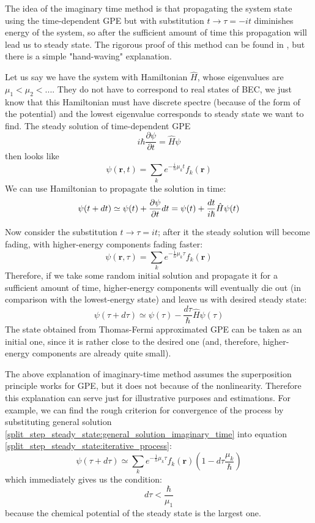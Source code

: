\documentclass[12pt,notitlepage]{report}
\begin{document}
The idea of the imaginary time method is that propagating the system state using the time-dependent GPE
but with substitution $t \rightarrow \tau = -it$ diminishes energy of the system, so after the sufficient
amount of time this propagation will lead us to steady state. The rigorous proof of this method can be found in
\cite{gpe_ngf}, but there is a simple "hand-waving" explanation.

Let us say we have the system with Hamiltonian $\hat{H}$, whose eigenvalues are $\mu_1 < \mu_2 < ...$.
They do not have to correspond to real states of BEC, we just know that this Hamiltonian must have discrete
spectre (because of the form of the potential) and the lowest eigenvalue corresponds to steady state we want
to find. The steady solution of time-dependent GPE
\[ i \hbar \frac{\partial \psi}{\partial t} = \hat{H} \psi \]
then looks like
\[ \psi(\mathbf{r}, t) = \sum_k e^{-\frac{i}{h} \mu_k t} f_k(\mathbf{r}) \]
We can use Hamiltonian to propagate the solution in time:
\[ 
\psi(t + dt) \simeq \psi(t) + \frac{\partial \psi}{\partial t} dt = \\
\psi(t) + \frac{dt}{i \hbar} \hat{H} \psi(t)
\]

Now consider the substitution $t \rightarrow \tau = it$; after it the steady solution will become fading, with
higher-energy components fading faster:
\begin{equation}
\label{split_step_steady_state:general_solution_imaginary_time}
\psi(\mathbf{r}, \tau) = \sum_k e^{-\frac{1}{h} \mu_k \tau} f_k(\mathbf{r})
\end{equation}
Therefore, if we take some random initial solution and propagate it for a sufficient amount of time, higher-energy
components will eventually die out (in comparison with the lowest-energy state) and leave us with desired 
steady state:
\begin{equation}
\label{split_step_steady_state:iterative_process}
\psi(\tau + d\tau) \simeq \psi(\tau) - \frac{d\tau}{\hbar} \hat{H} \psi(\tau)
\end{equation}
The state obtained from Thomas-Fermi approximated GPE can be taken as an initial one, since it is rather close
to the desired one (and, therefore, higher-energy components are already quite small).

The above explanation of imaginary-time method assumes the superposition principle works for GPE, but it does not
because of the nonlinearity. Therefore this explanation can serve just for illustrative purposes and estimations.
For example, we can find the rough criterion for convergence of the process by substituting general solution
\ref{split_step_steady_state:general_solution_imaginary_time} into equation
\ref{split_step_steady_state:iterative_process}:
\[ \psi(\tau + d\tau) \simeq \sum_k e^{-\frac{1}{h} \mu_k \tau} f_k(\mathbf{r}) \left( 1 - d\tau \frac{\mu_k}{\hbar} \right) \]
which immediately gives us the condition:
\[ d\tau < \frac{\hbar}{\mu_1} \]
because the chemical potential of the steady state is the largest one.
\end{document}
